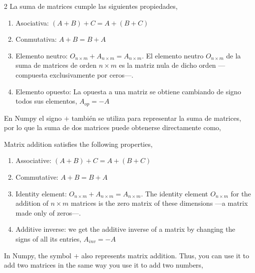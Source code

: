 \begin{paracol}{2}
La suma de matrices cumple las siguientes propiedades,
\begin{enumerate}
\item Asociativa: $(A+B)+C=A+(B+C)$
\item Conmutativa: $A+B=B+A$
\item Elemento neutro: $O_{n\times m}+A_{n\times m}=A_{n\times m}$. El elemento neutro $O_{n\times m}$ de la suma de matrices de orden $n\times m$ es la matriz nula de dicho orden ---compuesta exclusivamente por ceros---. 
\item Elemento opuesto: La opuesta a una matriz se obtiene cambiando de signo todos sus elementos, $A_{op}=-A$
\end{enumerate}
En Numpy el signo $+$ también se utiliza para representar la suma de matrices, por lo que la suma de dos matrices puede obtenerse directamente como,

\switchcolumn
Matrix addition satisfies the following properties,
\begin{enumerate}
\item Associative: $(A+B)+C=A+(B+C)$
\item Commutative: $A+B=B+A$
\item Identity element: $O_{n\times m}+A_{n\times m}=A_{n\times m}$. The identity element $O_{n\times m}$ for the addition of $n\times m$ matrices is the zero matrix of these dimensions ---a matrix made only of zeros---. 
\item Additive inverse: we get the additive inverse of a matrix by changing the signs of all its entries, $A_{inv}=-A$
\end{enumerate}
In Numpy, the symbol $+$ also represents matrix addition. Thus, you can use it to add two matrices in the same way you use it to add two numbers,
\end{paracol}

